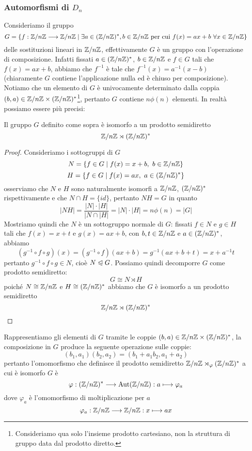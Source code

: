 \documentclass[11pt]{scrartcl}
\begin{document}
\subsubsection{Automorfismi di $D_n$}

Consideriamo il gruppo 
\[
    G = \{f: {\mathbb Z}/n{\mathbb Z}\longrightarrow{\mathbb Z}/n{\mathbb Z}\mid \exists a \in ({\mathbb Z}/n{\mathbb Z})^*, b \in {\mathbb Z}/n{\mathbb Z}\text{ per cui }
    f(x) = ax + b~\forall x \in {\mathbb Z}/n{\mathbb Z}\}
\]
delle sostituzioni lineari in ${\mathbb Z}/n{\mathbb Z}$, effettivamente $G$ è un gruppo con 
l'operazione di composizione. Infatti fissati $a \in ({\mathbb Z}/n{\mathbb Z})^*$, $b \in {\mathbb Z}/n{\mathbb Z}$ e
$f \in G$ tali che $f(x) = ax + b$, abbiamo che $f^{-1}$ è tale che 
$f^{-1}(x) = a^{-1}(x - b)$ (chiaramente $G$ contiene l'applicazione nulla 
ed è chiuso per composizione). Notiamo che un elemento di $G$ è univocamente
determinato dalla coppia $(b, a) \in {\mathbb Z}/n{\mathbb Z} \times ({\mathbb Z}/n{\mathbb Z})^*$\footnote{
    Consideriamo qua solo l'insieme prodotto cartesiano, non la struttura di 
    gruppo data dal prodotto diretto.
}, pertanto $G$
contiene $n\phi(n)$ elementi. In realtà possiamo essere più precisi:

\begin{proposition}
    Il gruppo $G$ definito come sopra è isomorfo a un prodotto semidiretto 
    \[
        {\mathbb Z}/n{\mathbb Z} \rtimes ({\mathbb Z}/n{\mathbb Z})^*
    \]
\end{proposition}

\begin{proof}
    Consideriamo i sottogruppi di $G$
    \[
        N = \{f \in G\mid f(x) = x + b,~b \in {\mathbb Z}/n{\mathbb Z}\}
    \]
    \[
        H = \{f \in G\mid f(x) = ax,~a \in ({\mathbb Z}/n{\mathbb Z})^*\}
    \]
    osserviamo che $N$ e $H$ sono naturalmente isomorfi a ${\mathbb Z}/n{\mathbb Z}$, $({\mathbb Z}/n{\mathbb Z})^*$ 
    rispettivamente e che $N \cap H = \{id\}$, pertanto $NH = G$ in quanto 
    \[
        |NH| = \frac{|N|\cdot|H|}{|N\cap|H|} = |N|\cdot|H| = n\phi(n) = |G|
    \]
    Mostriamo quindi che $N$ è un sottogruppo normale di $G$: fissati $f \in N$
    e $g \in H$ tali che $f(x) = x + t$ e $g(x) = ax + b$, con $b, t \in {\mathbb Z}/n{\mathbb Z}$ e 
    $a \in ({\mathbb Z}/n{\mathbb Z})^*$, abbiamo
    \[
        (g^{-1}\circ f \circ g)(x) = (g^{-1}\circ f)(ax + b) = g^{-1}(ax + b + t) = 
        x + a^{-1}t
    \]
        pertanto $g^{-1}\circ f\circ g \in N$, cioè $N\trianglelefteqslant G$.
    Possiamo quindi decomporre $G$ come prodotto semidiretto:
    \[
        G \cong N\rtimes H
    \]
    poiché $N \cong {\mathbb Z}/n{\mathbb Z}$ e $H \cong ({\mathbb Z}/n{\mathbb Z})^*$ abbiamo che $G$ è isomorfo a un
    prodotto semidiretto 
    \[
        {\mathbb Z}/n{\mathbb Z} \rtimes ({\mathbb Z}/n{\mathbb Z})^*
    \]
\end{proof}

Rappresentiamo gli elementi di $G$ tramite le coppie $(b, a) \in {\mathbb Z}/n{\mathbb Z}\times ({\mathbb Z}/n{\mathbb Z})^*$,
la composizione in $G$ produce la seguente operazione sulle coppie:
\[
    (b_1, a_1)(b_2, a_2) = (b_1 + a_1b_2, a_1 + a_2)
\]
pertanto l'omomorfismo che definisce il prodotto semidiretto ${\mathbb Z}/n{\mathbb Z} \rtimes_{\varphi}({\mathbb Z}/n{\mathbb Z})^*$
a cui è isomorfo $G$ è 
\[
    \varphi: ({\mathbb Z}/n{\mathbb Z})^* \longrightarrow \operatorname{Aut}({\mathbb Z}/n{\mathbb Z}): a \longmapsto \varphi_a
\]
dove $\varphi_a$ è l'omomorfismo di moltiplicazione per $a$
\[
    \varphi_a :{\mathbb Z}/n{\mathbb Z} \longrightarrow {\mathbb Z}/n{\mathbb Z}: x \longmapsto ax
\]
\end{document}
